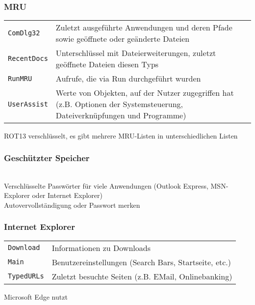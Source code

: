 \begin{multicols}{3}
\subsubsection{MRU}
\texttt{}
\begin{tabular}{@{}p{\the\MyLen}%
		@{}p{\linewidth-\the\MyLen}@{}}
	\texttt{ComDlg32} & Zuletzt ausgeführte Anwendungen und deren Pfade sowie geöffnete oder geänderte Dateien\\
	 \texttt{RecentDocs} & Unterschlüssel mit Dateierweiterungen, zuletzt geöffnete Dateien diesen Typs\\
	 \texttt{RunMRU} & Aufrufe, die via Run durchgeführt wurden\\
	 \texttt{UserAssist} & Werte von Objekten, auf der Nutzer zugegriffen hat (z.B. Optionen der Systemsteuerung, Dateiverknüpfungen und Programme)
\end{tabular}
ROT13 verschlüsselt, es gibt mehrere MRU-Listen in unterschiedlichen Listen

\subsubsection{Geschützter Speicher}
\texttt{}\\
Verschlüsselte Passwörter für viele Anwendungen (Outlook Express, MSN-Explorer oder Internet Explorer)\\
Autovervollständigung oder Passwort merken\\

\subsubsection{Internet Explorer}
\texttt{}
\begin{tabular}{@{}p{\the\MyLen}%
		@{}p{\linewidth-\the\MyLen}@{}}
	\texttt{Download} & Informationen zu Downloads\\
	\texttt{Main} & Benutzereinstellungen (Search Bars, Startseite, etc.)\\
	\texttt{TypedURLs} & Zuletzt besuchte Seiten (z.B. EMail, Onlinebanking)\\
\end{tabular}
Microsoft Edge nutzt \texttt{}


\end{multicols}
